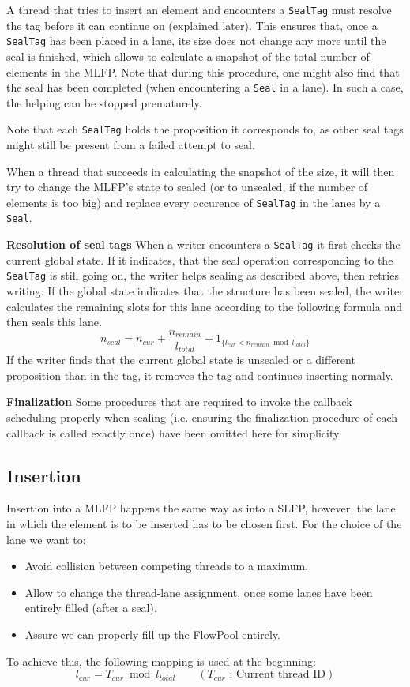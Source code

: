 \documentclass[runningheads,a4paper,fleqn]{llncs}
\begin{document}
A thread that tries to insert an element and encounters a
\verb+SealTag+ must resolve the tag before it can continue on
(explained later). This ensures that, once a \verb+SealTag+ has been
placed in a lane, its size does not change any more until the seal is
finished, which allows to calculate a snapshot of the total number of
elements in the MLFP. Note that during this procedure, one might also
find that the seal has been completed (when encountering a \verb+Seal+
in a lane). In such a case, the helping can be stopped prematurely.

Note that each \verb+SealTag+ holds the proposition it corresponds to,
as other seal tags might still be present from a failed attempt to
seal.

When a thread that succeeds in calculating the snapshot of the size,
it will then try to change the MLFP's state to sealed (or to unsealed,
if the number of elements is too big) and replace every occurence of
\verb+SealTag+ in the lanes by a \verb+Seal+.

\textbf{Resolution of seal tags} When a writer encounters a
\verb+SealTag+ it first checks the current global state. If it
indicates, that the seal operation corresponding to the \verb+SealTag+
is still going on, the writer helps sealing as described above, then
retries writing. If the global state indicates that the structure has
been sealed, the writer calculates the remaining slots for this lane
according to the following formula and then seals this lane.
\[ n_{seal} = n_{cur} + \frac{n_{remain}}{l_{total}} +
   1_{\{ l_{cur} < n_{remain} \bmod l_{total} \}} \]
If the writer finds that the current global state is unsealed or a
different proposition than in the tag, it removes the tag and
continues inserting normaly.

\textbf{Finalization} Some procedures that are required to invoke the
callback scheduling properly when sealing (i.e. ensuring the
finalization procedure of each callback is called exactly once) have
been omitted here for simplicity.

\subsection{Insertion}
Insertion into a MLFP happens the same way as into a SLFP, however,
the lane in which the element is to be inserted has to be chosen
first. For the choice of the lane we want to:
\begin{itemize}
\item Avoid collision between competing threads to a maximum.
\item Allow to change the thread-lane assignment, once some lanes have
  been entirely filled (after a seal).
\item Assure we can properly fill up the FlowPool entirely.
\end{itemize}
To achieve this, the following mapping is used at the beginning:
\[ l_{cur} = T_{cur} \bmod l_{total} \qquad
  (T_{cur} \text{ : Current thread ID}) \] 
\end{document}
